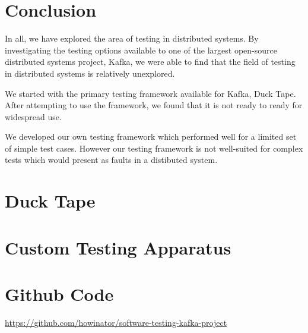 \begin{multicols}{2}
\section{Conclusion}

In all, we have explored the area of testing in distributed systems.
By investigating the testing options available to one of the largest open-source distributed systems project, Kafka, we were able to find that the field of testing in distributed systems is relatively unexplored.

We started with the primary testing framework available for Kafka, Duck Tape.
After attempting to use the framework, we found that it is not ready to ready for widespread use.

We developed our own testing framework which performed well for a limited set of simple test cases.
However our testing framework is not well-suited for complex tests which would present as faults in a distibuted system.

\section{Duck Tape}

\section{Custom Testing Apparatus}


\end{multicols}
\newpage







\appendix

\section{Github Code}

\href{https://github.com/howinator/software-testing-kafka-project}{https://github.com/howinator/software-testing-kafka-project}

%

